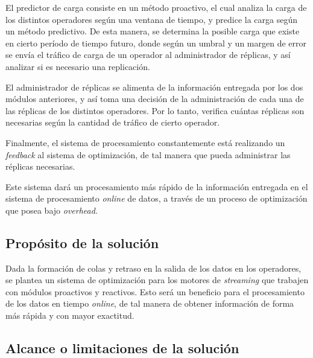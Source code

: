 \documentclass[12pt,letterpaper]{article}
\begin{document}
El predictor de carga consiste en un método proactivo, el cual analiza la carga de los distintos operadores según una ventana de tiempo, y predice la carga según un método predictivo. De esta manera, se determina la posible carga que existe en cierto período de tiempo futuro, donde según un umbral y un margen de error se envía el tráfico de carga de un operador al administrador de réplicas, y así analizar si es necesario una replicación.

El administrador de réplicas se alimenta de la información entregada por los dos módulos anteriores, y así toma una decisión de la administración de cada una de las réplicas de los distintos operadores. Por lo tanto, verifica cuántas réplicas son necesarias según la cantidad de tráfico de cierto operador.

Finalmente, el sistema de procesamiento constantemente está realizando un \textsl{feedback} al sistema de optimización, de tal manera que pueda administrar las réplicas necesarias.

Este sistema dar\'a un procesamiento más rápido de la información entregada en el sistema de procesamiento \textsl{online} de datos, a través de un proceso de optimización que posea bajo \textsl{overhead}.

\subsection{Propósito de la solución}

Dada la formación de colas y retraso en la salida de los datos en los operadores, se plantea un sistema de optimización para los motores de \textsl{streaming} que trabajen con módulos proactivos y reactivos. Esto será un beneficio para el procesamiento de los datos en tiempo \textsl{online}, de tal manera de obtener información de forma más rápida y con mayor exactitud.

\subsection{Alcance o limitaciones de la solución}
\end{document}
